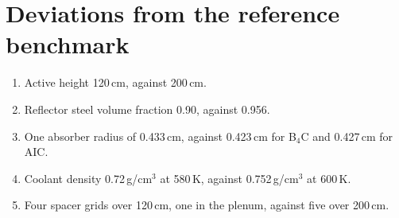 \section{Deviations from the reference benchmark}
\label{app:inputs-departures}

\begin{enumerate}[nosep]
  \item Active height 120\,cm, against 200\,cm.
  \item Reflector steel volume fraction 0.90, against 0.956.
  \item One absorber radius of 0.433\,cm, against 0.423\,cm for B$_4$C and 0.427\,cm for AIC.
  \item Coolant density 0.72\,g/cm$^3$ at 580\,K, against 0.752\,g/cm$^3$ at 600\,K.
  \item Four spacer grids over 120\,cm, one in the plenum, against five over 200\,cm.
\end{enumerate}
